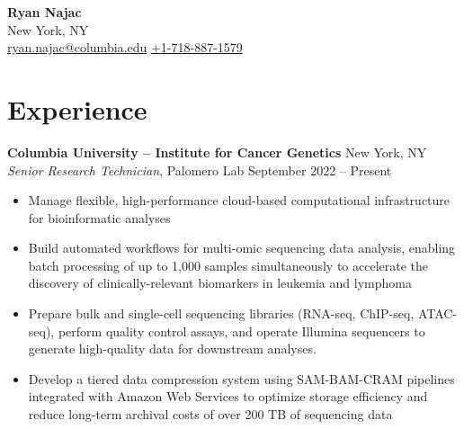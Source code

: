 \documentclass[11pt,a4paper]{article}   %
\begin{document}
\raggedright				%
\thispagestyle{empty}			%

\begin{center}
  {\LARGE \textbf{Ryan Najac} }\\
  {\large
    \vspace{0.1cm}New York, NY\\ \vspace{0.1cm}
    \href{mailto:ryan.najac@columbia.edu}{\faEnvelopeSquare\: ryan.najac@columbia.edu} \medspace
    \href{tel:+17188871579}{\faPhoneSquare\: +1-718-887-1579}			       \medspace \\
    \href{https://rdnajac.tech/}{\faGlobe\:             \underline{}} \quad
    \href{https://github.com/rdnajac}{\faGithubSquare\: \underline{}}          \quad
    \href{https://www.linkedin.com/in/ryan-najac/}{\faLinkedinSquare\:  \underline{}}
  }
\end{center}

\vspace{-0.6cm}
\section*{Experience}
\textbf{Columbia University – Institute for Cancer Genetics} \hfill New York, NY\\
\textit{Senior Research Technician}, Palomero Lab \hfill September 2022 – Present
\begin{itemize}
  \item Manage flexible, high-performance cloud-based computational infrastructure for bioinformatic analyses
  \item Build automated workflows for multi-omic sequencing data analysis, enabling batch processing of up to 1,000
        samples simultaneously to accelerate the discovery of clinically-relevant biomarkers in leukemia and lymphoma
  \item Prepare bulk and single-cell sequencing libraries (RNA-seq, ChIP-seq, ATAC-seq), perform quality control assays,
    and operate Illumina sequencers to generate high-quality data for downstream analyses.
  \item Develop a tiered data compression system using SAM-BAM-CRAM pipelines integrated with Amazon Web Services
        to optimize storage efficiency and reduce long-term archival costs of over 200 TB of sequencing data
\end{itemize}
\vspace{0.2cm}
\end{document}
